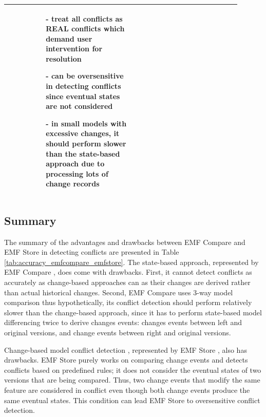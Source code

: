 \begin{table}[]
\begin{tabular}{|p{0.1\linewidth}|p{0.4\linewidth}|p{0.4\linewidth}|}
\begin{minipage}[t]{\linewidth}
\begin{itemize}[leftmargin=9pt]
			\item[]
		\end{itemize}
	\end{minipage}
	&
	\begin{minipage}[t]{\linewidth}
		\raggedright
		\begin{itemize}[leftmargin=9pt]
			\setlength\itemsep{2pt}
			\item[-] treat all conflicts as \textsf{REAL} conflicts which demand user intervention for resolution
			\item[-] can be oversensitive in detecting conflicts since eventual states are not considered
			\item[-] in small models with excessive changes, it should perform slower than the state-based approach due to processing lots of change records
			\item[]
		\end{itemize} 
	\end{minipage}
	\\
	\hline                         
\end{tabular}
\end{table}

\subsection{Summary}
\label{sec:summary}
The summary of the advantages and drawbacks between EMF Compare and EMF Store in detecting conflicts are presented in Table \ref{tab:accuracy_emfcompare_emfstore}. The state-based approach, represented by EMF Compare \cite{emfcompare2018developer}, does come with drawbacks. First, it cannot detect conflicts as accurately as change-based approaches can as their changes are derived rather than actual historical changes. Second, EMF Compare uses 3-way model comparison \cite{emfcompare2018developer} thus hypothetically, its conflict detection should perform relatively slower than the change-based approach, since it has to perform state-based model differencing twice to derive changes events: changes events between left and original versions, and change events between right and original versions. 

Change-based model conflict detection \cite{koegel2010operation}, represented by EMF Store \cite{emfstore2019what}, also has drawbacks. EMF Store purely works on comparing change events and detects conflicts based on predefined rules; it does not consider the eventual states of two versions that are being compared. Thus, two change events that modify the same feature are considered in conflict even though both change events produce the same eventual states. This condition can lead EMF Store to oversensitive conflict detection. 

